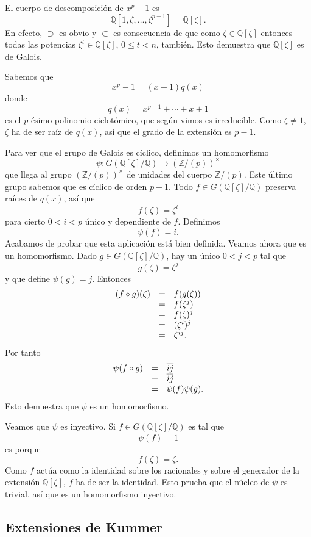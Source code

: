 El cuerpo de descomposición de \(x^p-1\) es
\[\mathbb Q[1,\zeta,\dots,\zeta^{p-1}]=\mathbb Q[\zeta].\] En efecto,
\(\supset\) es obvio y \(\subset\) es consecuencia de que como
\(\zeta\in\mathbb Q[\zeta]\) entonces todas las potencias
\(\zeta^t\in \mathbb Q[\zeta]\), \(0\leq t<n\), también. Esto demuestra
que \(\mathbb Q[\zeta]\) es de Galois.

Sabemos que \[x^p-1=(x-1)q(x)\] donde \[q(x)=x^{p-1}+\cdots+x+1\] es el
\(p\)-ésimo polinomio ciclotómico, que según vimos es irreducible. Como
\(\zeta\neq 1\), \(\zeta\) ha de ser raíz de \(q(x)\), así que el grado
de la extensión es \(p-1\).

Para ver que el grupo de Galois es cíclico, definimos un homomorfismo
\[\psi\colon G(\mathbb Q[\zeta]/\mathbb Q)\longrightarrow (\mathbb Z/(p))^\times\]
que llega al grupo \((\mathbb Z/(p))^\times\) de unidades del cuerpo
\(\mathbb Z/(p)\). Este último grupo sabemos que es cíclico de orden
\(p-1\). Todo \(f\in G(\mathbb Q[\zeta]/\mathbb Q)\) preserva raíces de
\(q(x)\), así que \[f(\zeta)=\zeta^i\] para cierto \(0{<}i{<}p\) único y
dependiente de \(f\). Definimos \[\psi(f)=\bar i.\] Acabamos de probar
que esta aplicación está bien definida. Veamos ahora que es un
homomorfismo. Dado \(g\in G(\mathbb Q[\zeta]/\mathbb Q)\), hay un único
\(0{<}j{<}p\) tal que \[g(\zeta)=\zeta^j\] y que define
\(\psi(g)=\bar j\). Entonces \[\begin{array}{rcl}
(f\circ g)(\zeta)&=&f(g(\zeta))\cr
&=&f(\zeta^j)\cr
&=&f(\zeta)^j\cr
&=&(\zeta^i)^j\cr
&=&\zeta^{ij}.
\end{array}\] Por tanto \[\begin{array}{rcl}
\psi(f\circ g)&=&\overline{ij}\cr
&=&\bar{i}\bar{j}\cr
&=&\psi(f)\psi(g).
\end{array}\] Esto demuestra que \(\psi\) es un homomorfismo.

Veamos que \(\psi\) es inyectivo. Si
\(f\in G(\mathbb Q[\zeta]/\mathbb Q)\) es tal que \[\psi(f)=\bar 1\] es
porque \[f(\zeta)=\zeta.\] Como \(f\) actúa como la identidad sobre los
racionales y sobre el generador de la extensión \(\mathbb{Q}[\zeta]\),
\(f\) ha de ser la identidad. Esto prueba que el núcleo de \(\psi\) es
trivial, así que es un homomorfismo inyectivo. 

\hypertarget{extensiones-de-kummer}{%
\subsection{Extensiones de Kummer}\label{extensiones-de-kummer}}

